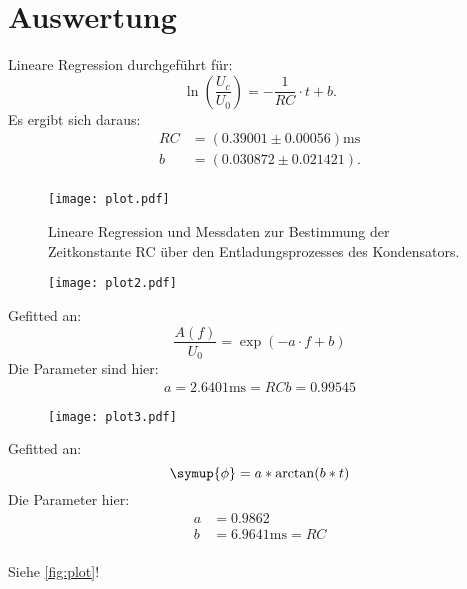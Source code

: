 \section{Auswertung}
\label{sec:Auswertung}
Lineare Regression durchgeführt für:
\begin{equation*}
    \ln\left(\frac{U_c}{U_0}\right)=-\frac{1}{RC}\cdot t + b.
\end{equation*}
Es ergibt sich daraus:
\begin{align*}
  RC &= (0.39001\pm 0.00056)\unit{\milli\second}\\
  b &= (0.030872\pm 0.021421).\\
\end{align*}
\begin{figure}
  \centering
  \texttt{[image: plot.pdf]}
  \caption{Lineare Regression und Messdaten zur Bestimmung der Zeitkonstante RC über den Entladungsprozesses des Kondensators.}
  \label{fig:plot}
\end{figure}

\begin{figure}
  \centering
  \texttt{[image: plot2.pdf]}
  \caption{}
  \label{fig:plot2}
\end{figure}
Gefitted an:
\begin{equation*}
  \frac{A(f)}{U_0} = \exp(-a\cdot f + b)
\end{equation*}
Die Parameter sind hier:
\begin{align*}
  a = 2.6401 \unit{\milli\second} = RC
  b = 0.99545
\end{align*}

\begin{figure}
  \centering
  \texttt{[image: plot3.pdf]}
  \caption{}
  \label{fig:plot3}
\end{figure}
Gefitted an:
\begin{equation*}
  \symup{\phi} = a*\arctan(b*t)
\end{equation*}
Die Parameter hier:
\begin{align*}
  a &=0.9862 \\
  b &=6.9641 \unit{\milli\second} = RC \\
\end{align*}

Siehe \autoref{fig:plot}!

